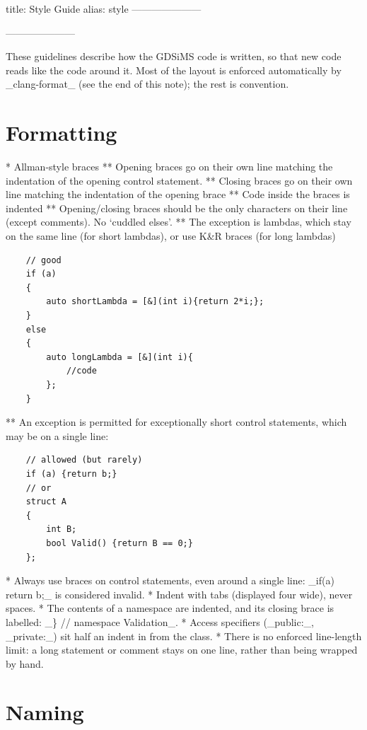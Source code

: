 title: Style Guide
alias: style
---------------------
\usepackage{listings}
\usepackage{hyperref}
\hypersetup{
	colorlinks=true,
	linkcolor=blue,
	filecolor=magenta,
	urlcolor=blue,
}
---------------------

These guidelines describe how the GDSiMS code is written, so that new code reads like the code around it. Most of the layout is enforced automatically by _clang-format_ (see the end of this note); the rest is convention.

\section{Formatting}

	* Allman-style braces
	** Opening braces go on their own line matching the indentation of the opening control statement.
	** Closing braces go on their own line matching the indentation of the opening brace
	** Code inside the braces is indented
	** Opening/closing braces should be the only characters on their line (except comments). No `cuddled elses'.
	** The exception is lambdas, which stay on the same line (for short lambdas), or use K\&R braces (for long lambdas)
	\begin{lstlisting}
	// good 
	if (a)
	{
		auto shortLambda = [&](int i){return 2*i;};
	}
	else
	{
		auto longLambda = [&](int i){
			//code
		};
	}
	\end{lstlisting}
	** An exception is permitted for exceptionally short control statements, which may be on a single line:
	\begin{lstlisting}
	// allowed (but rarely)
	if (a) {return b;}
	// or
	struct A
	{
		int B;
		bool Valid() {return B == 0;}
	};
	\end{lstlisting}
	* Always use braces on control statements, even around a single line: _if(a) return b;_ is considered invalid.
	* Indent with tabs (displayed four wide), never spaces.
	* The contents of a namespace are indented, and its closing brace is labelled: _\} // namespace Validation_.
	* Access specifiers (_public:_, _private:_) sit half an indent in from the class.
	* There is no enforced line-length limit: a long statement or comment stays on one line, rather than being wrapped by hand.

\section{Naming}


